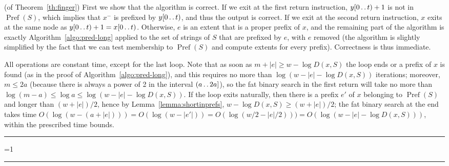 \documentclass{article}
\newcounter{noqed}
\newcommand{\qed}{ \ifmmode\mbox{ }\fi\rule[-.05em]{.3em}{.7em}\setcounter{noqed}{0}}
\newenvironment{proof}[1][{}]{\noindent{\bf Proof#1. }\setcounter{noqed}{1}}{\ifnum\value{noqed}=1\qed\fi\par\medskip}
\newcommand{\Pref}[1]{\operatorname{Pref}(#1)}
\newcommand{\?}{\mskip1.5mu}
\def\..{\,\mathpunct{\ldotp\ldotp}} %
\begin{document}
\begin{proof}(of Theorem~\ref{th:finger})
First we show that the algorithm is correct. 
If we exit at the first return instruction, $y[0\..t)+1$ is
not in $\Pref S$, which implies that $x^-$ is prefixed by $y[0\..t)$, and thus
the output is correct. If we exit at the second return instruction, $x$
exits at the same node as $y[0\..t)+1=x[0\..t)$. Otherwise, $e$ is an extent
that is a proper prefix of $x$, and the remaining part of the algorithm
is exactly Algorithm~\ref{algo:pred-long} applied to the set of strings of $S$ 
that are prefixed by $e$, with $e$ removed (the algorithm is slightly
simplified by the fact that we can test membership to $\Pref S$ and compute
extents for every prefix). Correctness is thus immediate.

All operations are constant time, except for the last loop. Note that as soon as
$m+|e|\geq w-\log D(x,S)$ the loop ends or a prefix of $x$ is found (as in the
proof of Algorithm~\ref{algo:pred-long}), and this requires no more than $\log(w-|e|-\log
D(x,S))$ iterations; moreover, $m\leq 2a$ (because there is always
a power of 2 in the interval $(a\..2a]$), so the fat binary search in the first
return will take no more than $\log(m-a)\leq \log a\leq \log (w-|e|-\log D(x,S))$.
If the loop exits naturally, then there is a prefix $e'$ of $x$ belonging
to $\Pref S$ and longer than $(w+|e|)/2$, hence by
Lemma~\ref{lemma:shortinprefs}, $w-\log D(x,S)\geq (w+|e|)/2$; the fat binary search at the
end takes time $O(\log (w-(a+|e|)))=O(\log (w-|e'|))=O(\log( w/2 -
|e|/2)))=O(\log(w-|e|-\log D(x,S)))$, within the prescribed time bounds.\qed
\end{proof}
\end{document}
